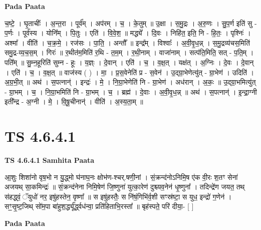 \documentclass[17pt]{extarticle}
\begin{document}
\textbf{Pada Paata} \newline

च॒ष्टे॒ । घृ॒ताचीः᳚ । अ॒न्त॒रा । पूर्व᳚म् । अप॑रम् । च॒ । के॒तुम् ॥ उ॒क्षा । स॒मु॒द्रः । अ॒रु॒णः । सु॒प॒र्ण इति॑ सु - प॒र्णः । पूर्व॑स्य । योनि᳚म् । पि॒तुः । एति॑ । वि॒वे॒श॒ ॥ मद्ध्ये᳚ । दि॒वः । निहि॑त॒ इति॒ नि - हि॒तः॒ । पृश्निः॑ । अश्मा᳚ । वीति॑ । च॒क्र॒मे॒ । रज॑सः । पा॒ति॒ । अन्तौ᳚ ॥ इन्द्र᳚म् । विश्वाः᳚ । अ॒वी॒वृ॒ध॒न्न् । स॒मु॒द्रव्य॑चस॒मिति॑ समु॒द्र-व्य॒च॒स॒म् । गिरः॑ ॥ र॒थीत॑म॒मिति॑ र॒थि - त॒म॒म् । र॒थी॒नाम् । वाजा॑नाम् । सत्प॑ति॒मिति॒ सत् - प॒ति॒म् । पति᳚म् ॥ सु॒म्न॒हूरिति॑ सुम्न - हूः । य॒ज्ञ्ः । दे॒वान् । एति॑ । च॒ । व॒क्ष॒त् । यक्ष॑त् । अ॒ग्निः । दे॒वः । दे॒वान् । एति॑ । च॒ । व॒क्ष॒त् ॥ वाज॑स्य ( ) । मा॒ । प्र॒स॒वेनेति॑ प्र - स॒वेन॑ । उ॒द्ग्रा॒भेणेत्यु॑त् - ग्रा॒भेण॑ । उदिति॑ । अ॒ग्र॒भी॒त् ॥ अथ॑ । स॒पत्नान्॑ । इन्द्रः॑ । मे॒ । नि॒ग्रा॒भेणेति॑ नि - ग्रा॒भेण॑ । अध॑रान् । अ॒कः॒ ॥ उ॒द्ग्रा॒भमित्यु॑त् - ग्रा॒भम् । च॒ । नि॒ग्रा॒भमिति॑ नि - ग्रा॒भम् । च॒ । ब्रह्म॑ । दे॒वाः । अ॒वी॒वृ॒ध॒न्न् ॥ अथ॑ । स॒पत्नान्॑ । इ॒न्द्रा॒ग्नी इती᳚न्द्र - अ॒ग्नी । मे॒ । वि॒षू॒चीनान्॑ । वीति॑ । अ॒स्य॒ता॒म् ॥  \newline




\section*{ TS 4.6.4.1 }

\textbf{TS 4.6.4.1 } \newline
\textbf{Samhita Paata} \newline

आ॒शुः शिशा॑नो वृष॒भो न यु॒द्ध्मो घ॑नाघ॒नः क्षोभ॑ण-श्चर्.षणी॒नां । सं॒क्रन्द॑नोऽनिमि॒ष ए॑क वी॒रः श॒तꣳ सेना॑ अजयथ् सा॒कमिन्द्रः॑ ॥ सं॒क्रन्द॑नेना निमि॒षेण॑ जि॒ष्णुना॑ युत्का॒रेण॑ दुश्च्यव॒नेन॑ धृ॒ष्णुना᳚ । तदिन्द्रे॑ण जयत॒ तथ् स॑हद्ध्वं॒ ॅयुधो॑ नर॒ इषु॑हस्तेन॒ वृष्णा᳚ ॥ स इषु॑हस्तैः॒ स नि॑षं॒गिभि॑र्व॒शी सꣳस्र॑ष्टा॒ स युध॒ इन्द्रो॑ ग॒णेन॑ । सꣳ॒॒सृ॒ष्ट॒जिथ् सो॑म॒पा बा॑हुश॒र्द्ध्यू᳚र्द्ध्वध॑न्वा॒ प्रति॑हिताभि॒रस्ता᳚ ॥ बृह॑स्पते॒ परि॑ दीया॒- [  ] \newline

\textbf{Pada Paata} \newline
\end{document}
